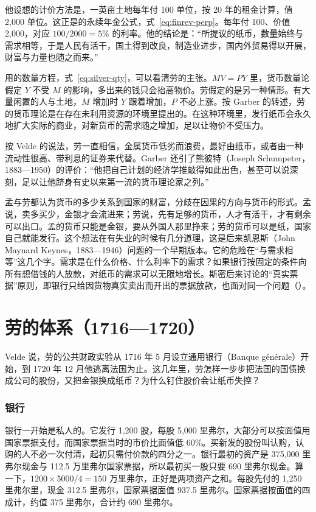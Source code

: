他设想的计价方法是，一英亩土地每年付 100 单位，按 20 年的租金计算，值 2,000 单位\cite{law1705}。这正是的永续年金公式，式~\eqref{eq:finrev-perp}。每年付 100、价值 2,000，对应 $100/2000=5\%$ 的利率。他的结论是：“所提议的纸币，数量始终与需求相等，于是人民有活干，国土得到改良，制造业进步，国内外贸易得以开展，财富与力量也随之而来。”\cite{law1705}

用的数量方程，式~\eqref{eq:silver-qty}，可以看清劳的主张。$MV=PY$ 里，货币数量论假定 $Y$ 不受 $M$ 的影响，多出来的钱只会抬高物价。劳假定的是另一种情形。有大量闲置的人与土地，$M$ 增加时 $Y$ 跟着增加，$P$ 不必上涨。按 Garber 的转述，劳的货币理论是在存在未利用资源的环境里提出的。在这种环境里，发行纸币会永久地扩大实际的商业，对新货币的需求随之增加，足以让物价不受压力\cite{garber1990}。

按 Velde 的说法，劳一直相信，金属货币低劣而浪费，最好由纸币，或者由一种流动性很高、带利息的证券来代替\cite{velde2003}。Garber 还引了熊彼特（Joseph Schumpeter，1883—1950）的评价：“他把自己计划的经济学推敲得如此出色，甚至可以说深刻，足以让他跻身有史以来第一流的货币理论家之列。”\cite{garber1990}

\begin{intuition}[劳把孟倒了过来]
孟与劳都认为货币的多少关系到国家的财富，分歧在因果的方向与货币的形式。孟说，卖多买少，金银才会流进来；劳说，先有足够的货币，人才有活干，才有剩余可以出口。孟的货币只能是金银，要从外国人那里挣来；劳的货币可以是纸，国家自己就能发行。这个想法在有失业的时候有几分道理，这是后来凯恩斯（John Maynard Keynes，1883—1946）问题的一个早期版本。它的危险在“与需求相等”这几个字。需求是在什么价格、什么利率下的需求？如果银行按固定的条件向所有想借钱的人放款，对纸币的需求可以无限地增长。斯密后来讨论的“真实票据”原则，即银行只给因货物真实卖出而开出的票据放款，也面对同一个问题（）。
\end{intuition}

\section{劳的体系（1716—1720）}\label{sec:merc-system}

Velde 说，劳的公共财政实验从 1716 年 5 月设立通用银行（Banque générale）开始，到 1720 年 12 月他逃离法国为止\cite{velde2003}。这几年里，劳怎样一步步把法国的国债换成公司的股份，又把金银换成纸币？为什么钉住股价会让纸币失控？

\subsubsection{银行}
银行一开始是私人的。它发行 1,200 股，每股 5,000 里弗尔，大部分可以按面值用国家票据支付，而国家票据当时的市价比面值低 60\%。买新发的股份叫认购，认购的人不必一次付清，起初只需付价款的四分之一。银行最初的资产是 375,000 里弗尔现金与 112.5 万里弗尔国家票据，所以最初买一股只要 690 里弗尔现金\cite{velde2003}。算一下，$1200\times5000/4=150$ 万里弗尔，正好是两项资产之和。每股先付的 1,250 里弗尔里，现金 312.5 里弗尔，国家票据面值 937.5 里弗尔。国家票据按面值的四成计，约值 375 里弗尔，合计约 690 里弗尔。

